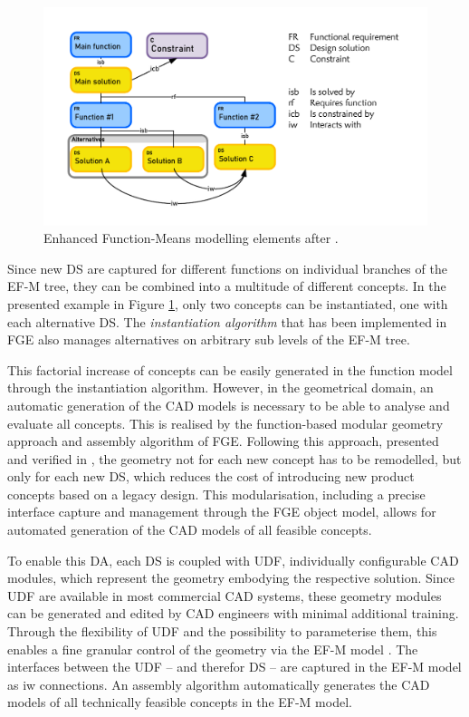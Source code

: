 \documentclass[aerospace,article,submit,moreauthors,pdftex]{Definitions/mdpi}
\begin{document}
\begin{figure}[ht]
    \centering
    \includegraphics[width=.6\textwidth]{figures/pdf/efm_basics.pdf}    
        \caption{Enhanced Function-Means modelling elements after \cite{Schachinger2000}.}
    \label{fig:EFM}
\end{figure}

Since new \ac{DS} are captured for different functions on individual branches of the EF-M tree, they can be combined into a multitude of different concepts.
In the presented example in Figure \ref{fig:EFM}, only two concepts can be instantiated, one with each alternative \ac{DS}.
The \textit{instantiation algorithm} that has been implemented in \ac{FGE} also manages alternatives on arbitrary sub levels of the \ac{EF-M} tree.

This factorial increase of concepts can be easily generated in the function model through the instantiation algorithm.
However, in the geometrical domain, an automatic generation of the CAD models is necessary to be able to analyse and evaluate all concepts.
This is realised by the function-based modular geometry approach and assembly algorithm of \ac{FGE}.
Following this approach, presented and verified in \cite{Muller2021FunctionVariants}, the geometry not for each new concept has to be remodelled, but only for each new DS, which reduces the cost of introducing new product concepts based on a legacy design.
This modularisation, including a precise interface capture and management through the \ac{FGE} object model, allows for automated generation of the CAD models of all feasible concepts.

To enable this \ac{DA}, each \ac{DS} is coupled with \ac{UDF}, individually configurable CAD modules, which represent the geometry embodying the respective solution.
Since \ac{UDF} are available in most commercial CAD systems, these geometry modules can be generated and edited by CAD engineers with minimal additional training.
Through the flexibility of \ac{UDF} and the possibility to parameterise them, this enables a fine granular control of the geometry via the \ac{EF-M} model \citep{King2017}.
The interfaces between the \ac{UDF} -- and therefor \ac{DS} -- are captured in the \ac{EF-M} model as \ac{iw} connections.
An assembly algorithm automatically generates the CAD models of all technically feasible concepts in the \ac{EF-M} model.
\end{document}
